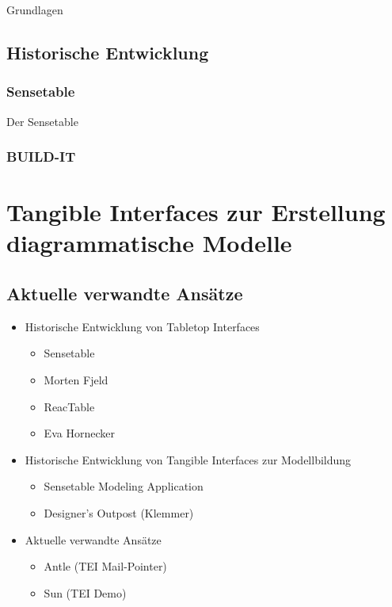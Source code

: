 Grundlagen

\subsection{Historische Entwicklung} %
\label{sub:historische_entwicklung_von_tabletop_interfaces}

\subsubsection{Sensetable} %
\label{subs:sensetable}
Der Sensetable \citep{Patten01}

\subsubsection{BUILD-IT} %
\label{par:build_it}
\citep{Fjeld01}

\section{Tangible Interfaces zur Erstellung diagrammatische Modelle} %
\label{sub:tangible_interfaces_zur_modellbildung}
\citep{Blackwell07}

\subsection{Aktuelle verwandte Ansätze} %
\label{sub:aktuelle_verwandte_ansätze}

\begin{itemize}
	\item Historische Entwicklung von Tabletop Interfaces
	\begin{itemize}
		\item Sensetable
		\item Morten Fjeld
		\item ReacTable
		\item Eva Hornecker
	\end{itemize}
	\item Historische Entwicklung von Tangible Interfaces zur Modellbildung
	\begin{itemize}
		\item Sensetable Modeling Application
		\item Designer's Outpost (Klemmer)
	\end{itemize}
	\item Aktuelle verwandte Ansätze
	\begin{itemize}
		\item Antle (TEI Mail-Pointer)
		\item Sun (TEI Demo)
	\end{itemize}
\end{itemize}



